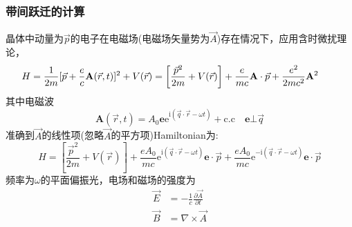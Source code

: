 \documentclass[cjk,slidestop,compress,mathserif,blue]{beamer}
\begin{document}
\frame
{
	\frametitle{带间跃迁的计算}
晶体中动量为$\vec p$的电子在电磁场(电磁场矢量势为$\vec A$)存在情况下，应用含时微扰理论，
\begin{displaymath}
	\hspace*{-20pt}
	H=\frac1{2m}[\vec p+\frac{e}c\mathbf{A}(\vec r,t)]^2+V(\vec r)=\left[ \frac{\vec p^2}{2m}+V(\vec r) \right]+\frac{e}{mc}\mathbf{A}\cdot\vec p+\frac{e^2}{2mc^2}\mathbf{A}^2
\end{displaymath}
其中电磁波
\begin{displaymath}
	\mathbf{A}(\vec r,t)=A_0\mathbf{e}\mathrm{e}^{\mathrm{i}(\vec q\cdot\vec r-\omega t)}+\mathrm{c.c}\quad\mathbf{e}\bot\vec q
\end{displaymath}
准确到$\vec A$的线性项(忽略$\vec A$的平方项)\textrm{Hamiltonian}为:
\begin{displaymath}
	H=\left[ \frac{\vec p^2}{2m}+V(\vec r) \right]+\frac{eA_0}{mc}\mathrm{e}^{\mathrm{i}(\vec q\cdot\vec r-\omega t)}\mathbf{e}\cdot\vec p+\frac{eA_0}{mc}\mathrm{e}^{-\mathrm{i}(\vec q\cdot\vec r-\omega t)}\mathbf{e}\cdot\vec p
\end{displaymath}
频率为$\omega$的平面偏振光，电场和磁场的强度为
\begin{displaymath}
\begin{aligned}
    \vec E&=-\frac1c\frac{\partial\vec A}{\partial t}\\
    \vec B&=\nabla\times\vec A
  \end{aligned}%
  \label{eq:optic-26}
\end{displaymath}
}
\end{document}
